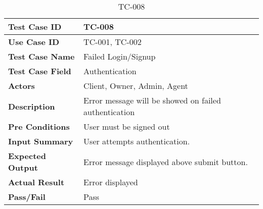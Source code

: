 \begin{table}[h]
	\centering
	\caption{TC-008}
	\begin{tabular}{ |p{3.8cm}|p{8cm}| }
		\hline
		\textbf{Test Case ID}    & TC-008                                                \\
		\hline
		\textbf{Use Case ID}     & TC-001, TC-002                                        \\
		\hline
		\textbf{Test Case Name}  & Failed Login/Signup                                   \\
		\hline
		\textbf{Test Case Field} & Authentication                                        \\
		\hline
		\textbf{Actors}          & Client, Owner, Admin, Agent                           \\
		\hline
		\textbf{Description}     & Error message will be showed on failed authentication \\
		\hline
		\textbf{Pre Conditions}  & User must be signed out                               \\
		\hline
		\textbf{Input Summary}   & User attempts authentication.                         \\
		\hline
		\textbf{Expected Output} & Error message displayed above submit button.          \\
		\hline
		\textbf{Actual Result}   & Error displayed                                       \\
		\hline
		\textbf{Pass/Fail}       & Pass                                                  \\
		\hline
	\end{tabular}
\end{table}